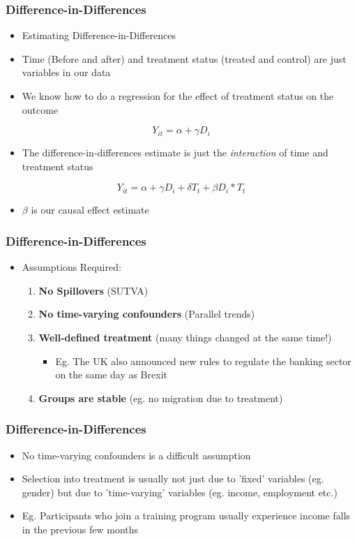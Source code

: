 \documentclass[xcolor=x11names,compress]{beamer}\usepackage[]{graphicx}\usepackage[]{xcolor}
\renewcommand{\(}{\begin{columns}}
\renewcommand{\)}{\end{columns}}
\newcommand{\<}[1]{\begin{column}{#1}}
\renewcommand{\>}{\end{column}}
\begin{document}
\begin{frame}
\frametitle{Difference-in-Differences}
\begin{itemize}
\item Estimating Difference-in-Differences
\pause
\item Time (Before and after) and treatment status (treated and control) are just variables in our data
\pause
\item We know how to do a regression for the effect of treatment status on the outcome
\end{itemize}
$$ Y_{it} = \alpha + \gamma D_i$$
\pause
\begin{itemize}
\item The difference-in-differences estimate is just the \textit{interaction} of time and treatment status
\end{itemize}
$$ Y_{it} = \alpha + \gamma D_i + \delta T_t + \beta D_i * T_t $$
\begin{itemize}
\item $\beta$ is our causal effect estimate
\end{itemize}
\end{frame}

\begin{frame}
\frametitle{Difference-in-Differences}
\begin{itemize}
\item Assumptions Required:
\begin{enumerate}
\item \textbf{No Spillovers} (SUTVA)
\item \textbf{No time-varying confounders} (Parallel trends)
\item \textbf{Well-defined treatment} (many things changed at the same time!)
\begin{itemize}
\item Eg. The UK also announced new rules to regulate the
banking sector on the same day as Brexit
\end{itemize}
\item \textbf{Groups are stable} (eg. no migration due to treatment)
\end{enumerate}
\end{itemize}
\end{frame}

\begin{frame}
\frametitle{Difference-in-Differences}
\begin{itemize}
\item No time-varying confounders is a difficult assumption
\pause
\item Selection into treatment is usually not just due to 'fixed' variables (eg. gender) but due to 'time-varying' variables (eg. income, employment etc.)
\pause
\item Eg. Participants who join a training program usually experience income falls in the previous few months
\end{itemize}
\end{frame}
\end{document}
